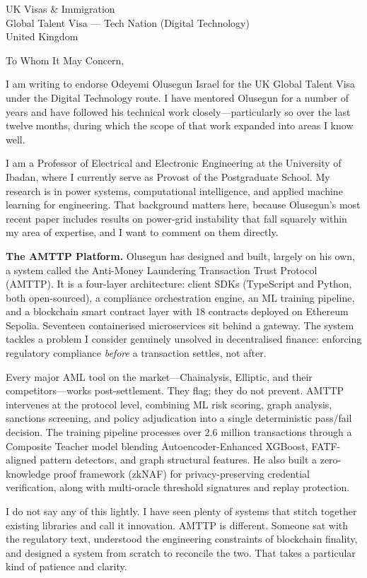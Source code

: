 \documentclass[12pt,a4paper]{letter}
\date{27 February 2026}
\begin{document}
\begin{letter}{UK Visas \& Immigration\\
Global Talent Visa --- Tech Nation (Digital Technology)\\
United Kingdom}

\opening{To Whom It May Concern,}

I am writing to endorse Odeyemi Olusegun Israel for the UK Global Talent Visa under the Digital Technology route. I have mentored Olusegun for a number of years and have followed his technical work closely---particularly so over the last twelve months, during which the scope of that work expanded into areas I know well.

I am a Professor of Electrical and Electronic Engineering at the University of Ibadan, where I currently serve as Provost of the Postgraduate School. My research is in power systems, computational intelligence, and applied machine learning for engineering. That background matters here, because Olusegun's most recent paper includes results on power-grid instability that fall squarely within my area of expertise, and I want to comment on them directly.

\textbf{The AMTTP Platform.} Olusegun has designed and built, largely on his own, a system called the Anti-Money Laundering Transaction Trust Protocol (AMTTP). It is a four-layer architecture: client SDKs (TypeScript and Python, both open-sourced), a compliance orchestration engine, an ML training pipeline, and a blockchain smart contract layer with 18 contracts deployed on Ethereum Sepolia. Seventeen containerised microservices sit behind a gateway. The system tackles a problem I consider genuinely unsolved in decentralised finance: enforcing regulatory compliance \textit{before} a transaction settles, not after.

Every major AML tool on the market---Chainalysis, Elliptic, and their competitors---works post-settlement. They flag; they do not prevent. AMTTP intervenes at the protocol level, combining ML risk scoring, graph analysis, sanctions screening, and policy adjudication into a single deterministic pass/fail decision. The training pipeline processes over 2.6 million transactions through a Composite Teacher model blending Autoencoder-Enhanced XGBoost, FATF-aligned pattern detectors, and graph structural features. He also built a zero-knowledge proof framework (zkNAF) for privacy-preserving credential verification, along with multi-oracle threshold signatures and replay protection.

I do not say any of this lightly. I have seen plenty of systems that stitch together existing libraries and call it innovation. AMTTP is different. Someone sat with the regulatory text, understood the engineering constraints of blockchain finality, and designed a system from scratch to reconcile the two. That takes a particular kind of patience and clarity.


\end{letter}
\end{document}

